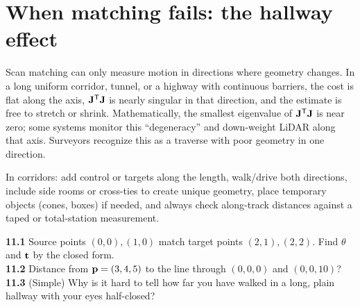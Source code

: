\section{When matching fails: the hallway effect}

\begin{eng}
Scan matching can only measure motion in directions where geometry changes. In a long uniform corridor, tunnel, or a highway with continuous barriers, the cost is flat along the axis, $\mathbf{J}^{\mathsf T}\mathbf{J}$ is nearly singular in that direction, and the estimate is free to stretch or shrink. Mathematically, the smallest eigenvalue of $\mathbf{J}^{\mathsf T}\mathbf{J}$ is near zero; some systems monitor this ``degeneracy'' and down-weight LiDAR along that axis. Surveyors recognize this as a traverse with poor geometry in one direction.
\end{eng}

\begin{tip}
In corridors: add control or targets along the length, walk/drive both directions, include side rooms or cross-ties to create unique geometry, place temporary objects (cones, boxes) if needed, and always check along-track distances against a taped or total-station measurement.
\end{tip}

\begin{tryit}
\textbf{11.1} Source points $(0,0),(1,0)$ match target points $(2,1),(2,2)$. Find $\theta$ and $\mathbf{t}$ by the closed form.\\
\textbf{11.2} Distance from $\mathbf{p}=(3,4,5)$ to the line through $(0,0,0)$ and $(0,0,10)$?\\
\textbf{11.3} (Simple) Why is it hard to tell how far you have walked in a long, plain hallway with your eyes half-closed?
\end{tryit}

